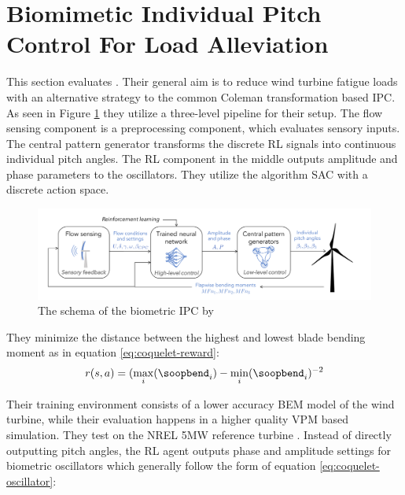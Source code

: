 \section{Biomimetic Individual Pitch Control For Load Alleviation}
\label{section:related-kotlett}

This section evaluates \citet{coqueletBiomimeticIndividualPitch2020}. Their general aim is to reduce wind turbine fatigue loads with an alternative strategy to the common Coleman transformation based IPC. As seen in Figure \ref{fig:coquelet-schema} they utilize a three-level pipeline for their setup. The flow sensing component is a preprocessing component, which evaluates sensory inputs. The central pattern generator transforms the discrete RL signals into continuous individual pitch angles. The \ac{RL} component in the middle outputs amplitude and phase parameters to the oscillators. They utilize the algorithm \ac{SAC} with a discrete action space.

\begin{figure}
  \includegraphics[width=\textwidth]{images/Coquelet-schema.png}
  \caption{The schema of the biometric \ac{IPC} by \citet[Figure 1]{coqueletBiomimeticIndividualPitch2020}}
  \label{fig:coquelet-schema}
\end{figure}

They minimize the distance between the highest and lowest blade bending moment as in equation \ref{eq:coquelet-reward}:
\begin{equation}
  r(s, a) = (\max_i(\soopbend_i) - \min_i(\soopbend_i)^{-2}
  \label{eq:coquelet-reward}
\end{equation}

Their training environment consists of a lower accuracy \ac{BEM} model of the wind turbine, while their evaluation happens in a higher quality \ac{VPM} based simulation. They test on the NREL 5MW reference turbine \cite{jonkmanDefinition5MWReference2009}. Instead of directly outputting pitch angles, the \ac{RL} agent outputs phase and amplitude settings for biometric oscillators which generally follow the form of equation \ref{eq:coquelet-oscillator}:

